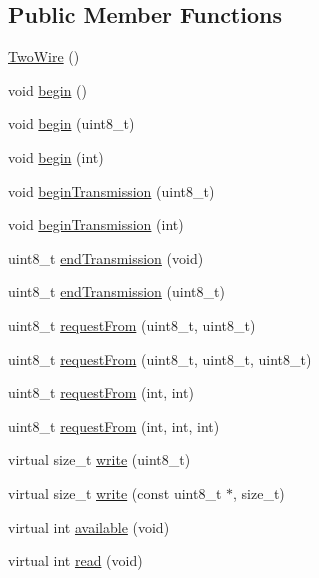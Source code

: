 \subsection*{\-Public \-Member \-Functions}
\begin{DoxyCompactItemize}
\item 
\hyperlink{class_two_wire_a4c7daf378c06e5e72762e1bd3d5937b6}{\-Two\-Wire} ()
\item 
void \hyperlink{class_two_wire_ada85a7a8663ec8af0a1248b659be2f18}{begin} ()
\item 
void \hyperlink{class_two_wire_a28bca087ed188781ef15e72622d3b1fb}{begin} (uint8\-\_\-t)
\item 
void \hyperlink{class_two_wire_a2806aa5684d36d7d20bf7c51cab3e602}{begin} (int)
\item 
void \hyperlink{class_two_wire_a8d55f00ea8ac3d7427d62e0c71e95ec2}{begin\-Transmission} (uint8\-\_\-t)
\item 
void \hyperlink{class_two_wire_a4da95eb4adced5dad152344243e57aad}{begin\-Transmission} (int)
\item 
uint8\-\_\-t \hyperlink{class_two_wire_af80f9a7b85a3a81a035ca94c95bcdc1d}{end\-Transmission} (void)
\item 
uint8\-\_\-t \hyperlink{class_two_wire_a289f5ef9bb0f79b31095fd72402ed54a}{end\-Transmission} (uint8\-\_\-t)
\item 
uint8\-\_\-t \hyperlink{class_two_wire_ae27d0936487551a05a1e9901bc456599}{request\-From} (uint8\-\_\-t, uint8\-\_\-t)
\item 
uint8\-\_\-t \hyperlink{class_two_wire_a4b4b618531a04d5488a52583a3dfb173}{request\-From} (uint8\-\_\-t, uint8\-\_\-t, uint8\-\_\-t)
\item 
uint8\-\_\-t \hyperlink{class_two_wire_ad40a27213d0bb32f7b819aa8962fccd3}{request\-From} (int, int)
\item 
uint8\-\_\-t \hyperlink{class_two_wire_a3d76da36fb8571e0b5e8310e9f86f6fe}{request\-From} (int, int, int)
\item 
virtual size\-\_\-t \hyperlink{class_two_wire_a318b7bec156c1f1075a818c0ad3427d7}{write} (uint8\-\_\-t)
\item 
virtual size\-\_\-t \hyperlink{class_two_wire_a1957b4d5a6a997bdde436e9e40d131a7}{write} (const uint8\-\_\-t $\ast$, size\-\_\-t)
\item 
virtual int \hyperlink{class_two_wire_aee57bc52bee06508e231c5fc6bc35ada}{available} (void)
\item 
virtual int \hyperlink{class_two_wire_aa361b83500d00dfb93bb25b6473b33e9}{read} (void)

\end{DoxyCompactItemize}
